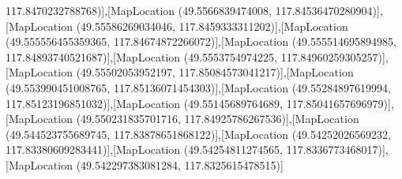 117.8470232788768)],[MapLocation (49.5566839474008, 117.84536470280904)],[MapLocation (49.55586269034046, 117.8459333311202)],[MapLocation (49.555556455359365, 117.84674872266072)],[MapLocation (49.555514695894985, 117.84893740521687)],[MapLocation (49.5553754974225, 117.84960259305257)],[MapLocation (49.55502053952197, 117.85084573041217)],[MapLocation (49.553990451008765, 117.85136071454303)],[MapLocation (49.55284897619994, 117.85123196851032)],[MapLocation (49.55145689764689, 117.85041657696979)],[MapLocation (49.550231835701716, 117.84925786267536)],[MapLocation (49.544523755689745, 117.83878651868122)],[MapLocation (49.54252026569232, 117.83380609283441)],[MapLocation (49.54254811274565, 117.8336773468017)],[MapLocation (49.542297383081284, 117.8325615478515)]